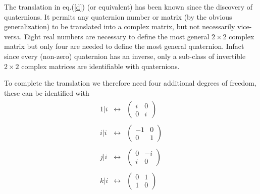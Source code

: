 The translation in eq.(\ref{d}) (or equivalent) has been known since the
discovery of quaternions. It permits any quaternion number or matrix (by
the obvious generalization) to be translated into a complex matrix, but not
necessarily vice-versa. Eight real numbers are necessary to define the most
general $2 \times 2$ complex matrix but only four are needed to define the
most general quaternion. Infact since every (non-zero) quaternion has an
inverse, only a sub-class of invertible $2 \times 2$ complex matrices are
identifiable with quaternions.

To complete the translation we therefore need four additional degrees of
freedom, these can be identified with
\begin{eqnarray} \label{e}
\begin{array}{ccc}
1\vert i & \leftrightarrow & \left( \begin{array}{cc} i & 0 \\
0 & i\end{array} \right)\\ \\
i\vert i & \leftrightarrow & \left( \begin{array}{cc} -1 & 0 \\
0 & 1\end{array} \right)\\ \\
j\vert i & \leftrightarrow & \left( \begin{array}{cc} 0 & -i \\
i & 0\end{array} \right)\\ \\
k\vert i & \leftrightarrow & \left( \begin{array}{cc} 0 & 1 \\
1 & 0\end{array} \right)
\end{array}
\end{eqnarray}

